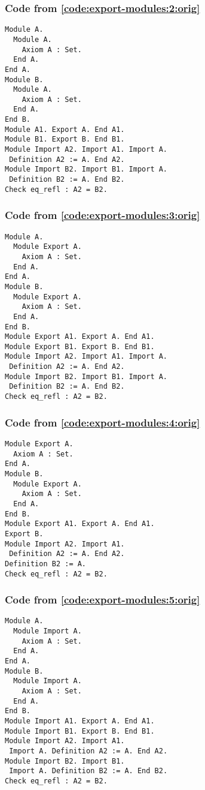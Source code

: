 \documentclass[a4paper,USenglish,cleveref,autoref,thm-restate]{lipics-v2021}
\begin{document}
\subsubsection{Code from \autoref{code:export-modules:2:orig}}\label{code:export-modules:2}
\begin{verbatim}
Module A.
  Module A.
    Axiom A : Set.
  End A.
End A.
Module B.
  Module A.
    Axiom A : Set.
  End A.
End B.
Module A1. Export A. End A1.
Module B1. Export B. End B1.
Module Import A2. Import A1. Import A.
 Definition A2 := A. End A2.
Module Import B2. Import B1. Import A.
 Definition B2 := A. End B2.
Check eq_refl : A2 = B2.
\end{verbatim}

\subsubsection{Code from \autoref{code:export-modules:3:orig}}\label{code:export-modules:3}
\begin{verbatim}
Module A.
  Module Export A.
    Axiom A : Set.
  End A.
End A.
Module B.
  Module Export A.
    Axiom A : Set.
  End A.
End B.
Module Export A1. Export A. End A1.
Module Export B1. Export B. End B1.
Module Import A2. Import A1. Import A.
 Definition A2 := A. End A2.
Module Import B2. Import B1. Import A.
 Definition B2 := A. End B2.
Check eq_refl : A2 = B2.
\end{verbatim}


\subsubsection{Code from \autoref{code:export-modules:4:orig}}\label{code:export-modules:4}
\begin{verbatim}
Module Export A.
  Axiom A : Set.
End A.
Module B.
  Module Export A.
    Axiom A : Set.
  End A.
End B.
Module Export A1. Export A. End A1.
Export B.
Module Import A2. Import A1.
 Definition A2 := A. End A2.
Definition B2 := A.
Check eq_refl : A2 = B2.
\end{verbatim}

\subsubsection{Code from \autoref{code:export-modules:5:orig}}\label{code:export-modules:5}
\begin{verbatim}
Module A.
  Module Import A.
    Axiom A : Set.
  End A.
End A.
Module B.
  Module Import A.
    Axiom A : Set.
  End A.
End B.
Module Import A1. Export A. End A1.
Module Import B1. Export B. End B1.
Module Import A2. Import A1.
 Import A. Definition A2 := A. End A2.
Module Import B2. Import B1.
 Import A. Definition B2 := A. End B2.
Check eq_refl : A2 = B2.
\end{verbatim}
\end{document}

